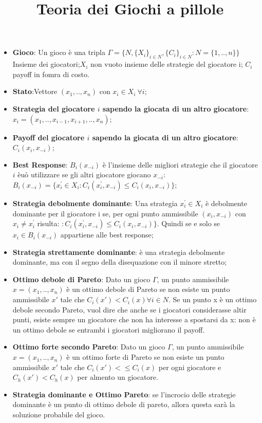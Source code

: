 \documentclass{article}
\title{Teoria dei Giochi a pillole}
\theoremstyle{definition}
\theoremstyle{remark}
\begin{document}
\graphicspath{ {./images/} }
\begin{itemize}
    \item \textbf{Gioco}: Un gioco è una tripla \(\Gamma=\{N,\{X_i\}_{i\in N},\{C_i\}_{i\in N}:N=\{1,..,n\}\}\) Insieme dei giocatori;$X_i$ non vuoto insieme delle strategie del giocatore i; $C_i$ payoff in fomra di costo.
    \item \textbf{Stato}:Vettore $(x_1,..,x_n)$ con $x_i\in X_i\ \forall i$;
    \item \textbf{Strategia del giocatore $i$ sapendo la giocata di un altro giocatore}:$x_i=(x_1,..,x_{i-1},x_{i+1},..,x_n)$;
    \item \textbf{Payoff del giocatore $i$ sapendo la giocata di un altro giocatore}:$C_i(x_i,x_{-i})$;
    \item \textbf{Best Response}: $B_i(x_{-i})$ è l'insieme delle migliori strategie che il giocatore $i$ èuò utilizzare se gli altri giocatore giocano $x_{-i}$: $B_i(x_{-i})=\{x_i^{'}\in X_i:C_i(x_i^{'},x_{-i})\leq C_i(x_i,x_{-i})\}$;
    \item \textbf{Strategia debolmente dominante}: Una strategia $x_i^{'}\in X_i$ è debolmente dominante per il giocatore i se, per ogni punto ammissibile $(x_i,x_{-i})$ con $x_i \neq x_{i}^{'}$ risulta: $:C_i(x_i^{'},x_{-i})\leq C_i(x_i,x_{-i})\}$. Quindi se e solo se $x_i\in  B_i(x_{-i})$ appartiene alle best response;
    \item\textbf{Strategia strettamente dominante}: è una strategia debolmente dominante, ma con il segno della disequazione con il minore stretto;
    \item \textbf{Ottimo debole di Pareto}: Dato un gioco $\Gamma$, un punto ammissibile $x=(x_1,..,x_n)$ è un ottimo debole di Pareto se non esiste un punto ammissibile $x'$ tale che $C_i(x')<C_i(x) \forall i\in N$. Se un punto x è un ottimo debole secondo Pareto, vuol dire che anche se i giocatori considerasse altir punti, esiste sempre un giocatore che non ha interesse a spostarsi da x: non è un ottimo debole se entrambi i giocatori migliorano il payoff.
    \item \textbf{Ottimo forte secondo Pareto}: Dato un gioco $\Gamma$, un punto ammissibile $x=(x_1,..,x_n)$ è un ottimo forte di Pareto se non esiste un punto ammissibile $x'$ tale che  $C_i(x')<\leq C_i(x)$ per ogni giocatore e $C_h(x')<C_h(x)$ per almento un giocatore.
    \item \textbf{Strategia dominante e Ottimo Pareto}: se l'incrocio delle strategie dominante è un punto di ottimo debole di pareto, allora questa sarà la soluzione probabile del gioco.

\end{itemize}
\end{document}
